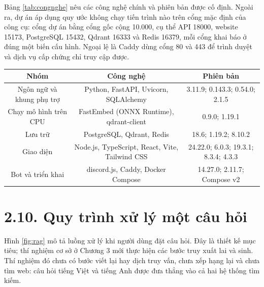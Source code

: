 Bảng \ref{tab:congnghe} nêu các công nghệ chính và phiên bản được cố định. Ngoài ra, dự án áp dụng quy ước không chạy tiến trình nào trên cổng mặc định của công cụ: cổng dự án bằng cổng gốc cộng 10.000, cụ thể API 18000, website 15173, PostgreSQL 15432, Qdrant 16333 và Redis 16379, mỗi cổng khai báo ở đúng một biến cấu hình. Ngoại lệ là Caddy dùng cổng 80 và 443 để trình duyệt và dịch vụ cấp chứng chỉ truy cập được.


\begin{longtable*}{|C{0.30}|C{0.38}|C{0.32}|}
\hline \textbf{Nhóm} & \textbf{Công nghệ} & \textbf{Phiên bản} \\ \hline
Ngôn ngữ và khung phụ trợ & Python, FastAPI, Uvicorn, SQLAlchemy & 3.11.9; 0.143.3; 0.54.0; 2.1.5 \\ \hline
Chạy mô hình trên CPU & FastEmbed (ONNX Runtime), qdrant-client & 0.9.0; 1.19.1 \\ \hline
Lưu trữ & PostgreSQL, Qdrant, Redis & 18.6; 1.19.2; 8.10.2 \\ \hline
Giao diện & Node.js, TypeScript, React, Vite, Tailwind CSS & 24.22.0; 6.0.3; 19.3.1; 8.3.4; 4.3.3 \\ \hline
Bot và triển khai & discord.js, Caddy, Docker Compose & 14.27.0; 2.11.7; Compose v2 \\ \hline
\end{longtable*}
\tabend


\section{2.10. Quy trình xử lý một câu hỏi}

Hình \ref{fig:rag} mô tả luồng xử lý khi người dùng đặt câu hỏi. Đây là thiết kế mục tiêu; thí nghiệm cơ sở ở Chương 3 mới thực hiện các bước truy xuất lai và sinh. Thí nghiệm đó chưa có bước viết lại hay dịch truy vấn, chưa xếp hạng lại và chưa tìm web: câu hỏi tiếng Việt và tiếng Anh được đưa thẳng vào cả hai hệ thống tìm kiếm.



